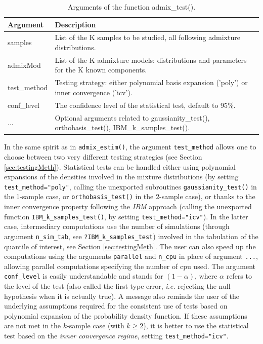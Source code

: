 \begin{table}[!h]
\centering
\caption{\label{tab:admixTestArgs-latex}Arguments of the function admix\_test().}
\centering
\fontsize{8}{10}\selectfont
\begin{tabular}[t]{ll}
\toprule
Argument & Description\\
\midrule
samples & List of the K samples to be studied, all following admixture distributions.\\
admixMod & List of the K admixture models: distributions and parameters for the K known components.\\
test\_method & Testing strategy: either polynomial basis expansion ('poly') or inner convergence ('icv').\\
conf\_level & The confidence level of the statistical test, default to 95\%.\\
... & Optional arguments related to gaussianity\_test(), orthobasis\_test(), IBM\_k\_samples\_test().\\
\bottomrule
\end{tabular}
\end{table}

In the same spirit as in \texttt{admix\_estim()}, the argument \texttt{test\_method} allows one to choose between two very different testing strategies (see Section \ref{sec:testingMeth}). Statistical tests can be handled either using polynomial expansions of the densities involved in the mixture distributions (by setting \texttt{test\_method="poly"}, calling the unexported subroutines \texttt{gaussianity\_test()} in the 1-sample case, or \texttt{orthobasis\_test()} in the 2-sample case), or thanks to the inner convergence property following the \emph{IBM} approach (calling the unexported function \texttt{IBM\_k\_samples\_test()}, by setting \texttt{test\_method="icv"}). In the latter case, intermediary computations use the number of simulations (through argument \texttt{n\_sim\_tab}, see \texttt{?IBM\_k\_samples\_test}) involved in the tabulation of the quantile of interest, see Section \ref{sec:testingMeth}. The user can also speed up the computations using the arguments \texttt{parallel} and \texttt{n\_cpu} in place of argument \texttt{...}, allowing parallel computations specifying the number of cpu used.
The argument \texttt{conf\_level} is easily understandable and stands for \((1-\alpha)\), where \(\alpha\) refers to the level of the test (also called the first-type error, \emph{i.e.} rejecting the null hypothesis when it is actually true). A message also reminds the user of the underlying assumptions required for the consistent use of tests based on polynomial expansion of the probability density function. If these assumptions are not met in the \(k\)-sample case (with \(k \geq 2\)), it is better to use the statistical test based on the \emph{inner convergence regime}, setting \texttt{test\_method="icv"}.

